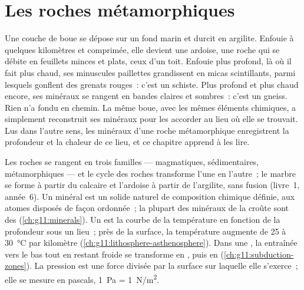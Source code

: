 \chapter{Les roches métamorphiques}\label{ch:g12:metamorphic-rocks}

Une couche de boue se dépose sur un fond marin et durcit en argilite.
Enfouie à quelques kilomètres et comprimée, elle devient une ardoise, une
roche qui se débite en feuillets minces et plats, ceux d'un toit. Enfouie
plus profond, là où il fait plus chaud, ses minuscules paillettes
grandissent en micas scintillants, parmi lesquels gonflent des grenats
rouges~: c'est un schiste. Plus profond et plus chaud encore, ses minéraux
se rangent en bandes claires et sombres~: c'est un gneiss. Rien n'a fondu
en chemin. La même boue, avec les mêmes éléments chimiques, a simplement
reconstruit ses minéraux pour les accorder au lieu où elle se trouvait.
Lus dans l'autre sens, les minéraux d'une roche métamorphique enregistrent
la profondeur et la chaleur de ce lieu, et ce chapitre apprend à les lire.

\begin{recall}
Les roches se rangent en trois familles --- magmatiques, sédimentaires,
métamorphiques --- et le cycle des roches transforme l'une en l'autre~; le
marbre se forme à partir du calcaire et l'ardoise à partir de l'argilite,
sans fusion (livre~1, année~6). Un minéral est un solide naturel de
composition chimique définie, aux atomes disposés de façon ordonnée~; la
plupart des minéraux de la croûte sont des 
(\cref{ch:g11:minerals}). Un  est la courbe de la température en
fonction de la profondeur sous un lieu~; près de la surface, la température
augmente de 25 à \qty{30}{\celsius} par kilomètre
(\cref{ch:g11:lithosphere-asthenosphere}). Dans une , la
 entraînée vers le bas tout en restant froide se transforme
en , puis en  (\cref{ch:g11:subduction-zones}). La
pression est une force divisée par la surface sur laquelle elle s'exerce~;
elle se mesure en pascals, \qty{1}{Pa} = \qty{1}{N/m^2}.
\end{recall}

